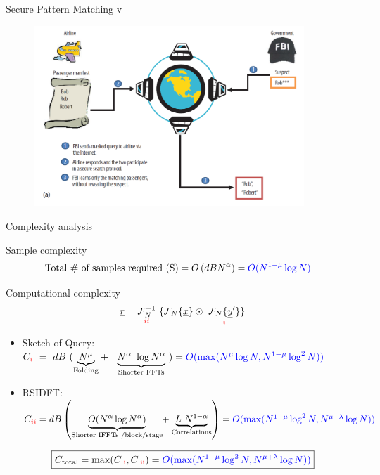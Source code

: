 \documentclass[10pt,xcolor=table]{beamer}
\newcommand{\xv}{\underline{x}}
\newcommand{\yv}{\underline{y}}
\newcommand{\rv}{\underline{r}}
\newcommand{\RNum}[1]{\uppercase\expandafter{\romannumeral #1\relax}}
\begin{document}
\begin{frame}{Secure Pattern Matching}
v\begin{figure}
  \centering
  \includegraphics[width=4.0in]{airline}
\end{figure}
\end{frame}
\begin{frame}{Complexity analysis}
	\begin{block}{Sample complexity}
		\vspace{-10pt}
		\begin{align*}
		\text{Total \# of samples required (S)} &= O \left(dBN^{\alpha}\right) =   {\color{blue}O(N^{1-\mu}\log N)}
		\end{align*}
	\end{block}
\pause
	\begin{block}{Computational complexity}
		\begin{equation*}\label{eqn:Rxy_fourier}
		\rv = \underset{\color{red}  \RNum{2} } {\mathcal{F}_{N}^{-1}} \ \{   \mathcal{F}_{N}\{\xv\}  \odot \ \underset{\color{red}  \RNum{1}  }{ \mathcal{F}_{N}\{\yv'\}}  \}
		\end{equation*}
		\vspace{-10pt}
\pause
	\begin{itemize}
		\item {\color{blue}Sketch of Query:}\\ \vspace{5pt}
	 {\small $C_{\color{red}\RNum{1}} \ = \  dB ~
	 ( \underset{\text{Folding} }{\underbrace{N^{\mu}}} + \ \
	 \underset{\text{Shorter FFTs} }{\underbrace{N^{\alpha} \ \log N^{\alpha}}} \ )
	 =  {\color{blue} O(\max(N^{\mu}\log N,N^{1-\mu}\log^2 N)) }$}
\pause
		\item {\color{blue}RSIDFT:} \\	{\small$C_{\color{red} \RNum{2}} =  {d B}  \left (
			\underset{\text{Shorter IFFTs /block/stage} }{\underbrace{ O(N^{\alpha}  \log N^{\alpha})}} \hspace{-3pt}+ \underset{\text{Correlations} }{\underbrace{ L~N^{1-\alpha}}} \right ) = {\color{blue} O(\max(N^{1-\mu}\log^2 N ,N^{\mu+\lambda}\log N)) }$}
	\end{itemize}
	\vspace{10pt}	
	\[\boxed{C_{\text{total}} = \max(C_{\color{red} \text{ \RNum{1}}},C_{\color{red} \text{ \RNum{2}}}) = {\color{blue} O(\max(N^{1-\mu}\log^2 N ,N^{\mu+\lambda}\log N)) }}\]
		
	\end{block}
\end{frame}
\end{document}
